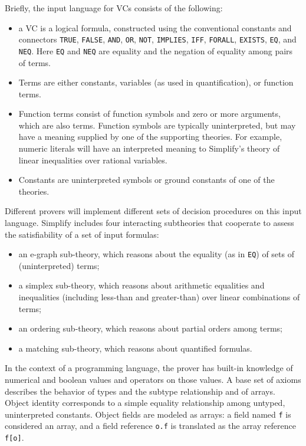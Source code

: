 \documentclass{sig-alternate}
\begin{document}
Briefly, the input language for VCs consists of the following:
\begin{itemize}
\item a VC is a logical formula, constructed using the conventional constants and connectors
\texttt{TRUE}, \texttt{FALSE}, \texttt{AND}, \texttt{OR}, \texttt{NOT}, \texttt{IMPLIES},
\texttt{IFF}, \texttt{FORALL}, \texttt{EXISTS}, \texttt{EQ}, and \texttt{NEQ}.  Here \texttt{EQ} and
\texttt{NEQ} are equality and the negation of equality among pairs of terms.
\item Terms are either constants, variables (as used in quantification), or function terms.
\item Function terms consist of function symbols and zero or more arguments, which are also
terms.  Function symbols are typically uninterpreted, but may have a meaning supplied by
one of the supporting theories.  For example, numeric literals will have an interpreted meaning
to Simplify's theory of linear inequalities over rational variables.
\item Constants are uninterpreted symbols or ground constants of one of the theories.
\end{itemize}

Different provers will implement different sets of decision procedures on this input language.
Simplify includes four interacting subtheories that cooperate to assess the satisfiability of a 
set of input formulas:
\begin{itemize}
\item an e-graph sub-theory, which reasons about the equality (as in \texttt{EQ}) of sets of
(uninterpreted) terms;
\item a simplex sub-theory, which reasons about arithmetic equalities and inequalities (including less-than and greater-than) over linear combinations
of terms;
\item an ordering sub-theory, which reasons about partial orders among terms;
\item a matching sub-theory, which reasons about quantified formulas.
\end{itemize}

In the context of a programming language, the prover has built-in knowledge of numerical and
boolean values and operators on those values.  A base set of axioms describes the behavior 
of types and the subtype relationship and of arrays.  Object identity corresponds to a simple
equality relationship among untyped, uninterpreted constants.  Object fields are modeled as
arrays: a field named \texttt{f} is considered an array, and a field reference \texttt{o.f} is
translated as the array reference \texttt{f[o]}.
\end{document}
